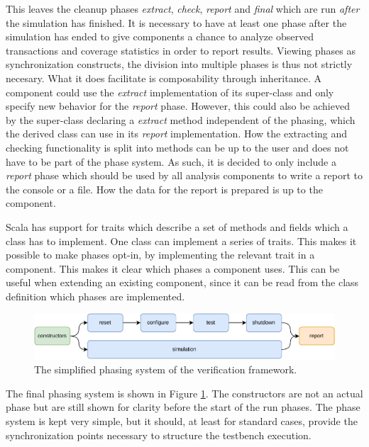 This leaves the cleanup phases \textit{extract}, \textit{check}, \textit{report} and \textit{final} which are run \textit{after} the simulation has finished. It is necessary
to have at least one phase after the simulation has ended to give components a chance to analyze observed
transactions and coverage statistics in order to report results. Viewing phases as synchronization constructs, the
division into multiple phases is thus not strictly necesary. What it does facilitate is composability through
inheritance. A component could use the \textit{extract} implementation of its super-class and only specify new
behavior for the \textit{report} phase. However, this could also be achieved by the super-class declaring a
\textit{extract} method independent of the phasing, which the derived class can use in its \textit{report} implementation. How the extracting and
checking functionality is split into methods can be up to the user and does not have to be part of the phase system.
As such, it is decided to only include a \textit{report} phase which should be used by all analysis components to write a report to the console or a file. How the data for the report is prepared is up to the component.

Scala has support for traits which describe a set of methods and fields which a class has to implement. One class can
implement a series of traits. This makes it possible to make phases opt-in, by implementing the relevant trait in a
component. This makes it clear which phases a component uses. This can be useful when extending an existing
component, since it can be read from the class definition which phases are implemented.

\begin{figure}
  \centering
  \includegraphics[width=\textwidth]{diagrams/own_phases.pdf}
  \caption{The simplified phasing system of the verification framework.}
  \label{fig:phases}
\end{figure}

The final phasing system is shown in Figure \ref{fig:phases}. The constructors are not an actual phase but are still
shown for clarity before the start of the run phases. The phase system is kept very simple, but it should, at least
for standard cases, provide the synchronization points necessary to structure the testbench execution.

